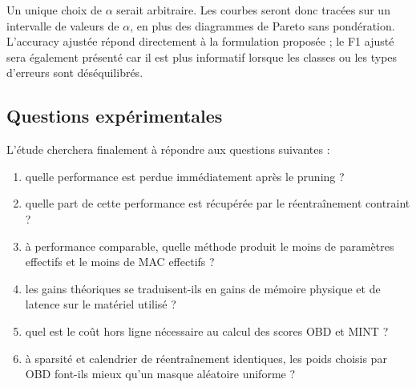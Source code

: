 Un unique choix de $\alpha$ serait arbitraire. Les courbes seront donc tracées
sur un intervalle de valeurs de $\alpha$, en plus des diagrammes de Pareto sans
pondération. L'accuracy ajustée répond directement à la formulation proposée ;
le F1 ajusté sera également présenté car il est plus informatif lorsque les
classes ou les types d'erreurs sont déséquilibrés.

\subsection{Questions expérimentales}
\label{ssec:probleme_questions}

L'étude cherchera finalement à répondre aux questions suivantes :
\begin{enumerate}
    \item quelle performance est perdue immédiatement après le pruning ?
    \item quelle part de cette performance est récupérée par le
    réentraînement contraint ?
    \item à performance comparable, quelle méthode produit le moins de
    paramètres effectifs et le moins de MAC effectifs ?
    \item les gains théoriques se traduisent-ils en gains de mémoire physique
    et de latence sur le matériel utilisé ?
    \item quel est le coût hors ligne nécessaire au calcul des scores OBD et
    MINT ?
    \item à sparsité et calendrier de réentraînement identiques, les poids
    choisis par OBD font-ils mieux qu'un masque aléatoire uniforme ?
\end{enumerate}

